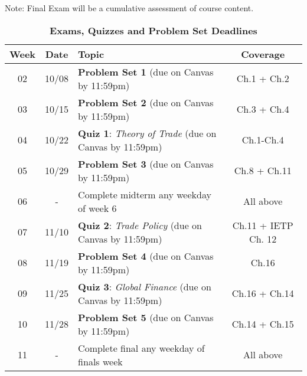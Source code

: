 \documentclass[10pt]{article}
\newcommand{\ra}[1]{\renewcommand{\arraystretch}{#1}}
\begin{document}
Note: Final Exam will be a cumulative assessment of course content. 

\newpage

\begin{table}[h!]
	\caption*{\large\textbf{Exams, Quizzes and Problem Set Deadlines}}
	\centering
	\ra{1.5}
	\begin{tabular}{@{\extracolsep{0.5cm}} c c l c @{}}
		\toprule
		\textbf{Week} & \textbf{Date} & \textbf{Topic} & \textbf{Coverage}  \\ \toprule 
		02 & 10/08 & \textbf{Problem Set 1} (due on Canvas by 11:59pm) & Ch.1 + Ch.2  \\
		03 & 10/15 & \textbf{Problem Set 2} (due on Canvas by 11:59pm) & Ch.3 + Ch.4  \\ 
		04 & 10/22 & \textbf{Quiz 1}: \textit{Theory of Trade} (due on Canvas by 11:59pm) & Ch.1-Ch.4 \\
		05 & 10/29 & \textbf{Problem Set 3} (due on Canvas by 11:59pm) & Ch.8 + Ch.11 \\ 
		06 & - & Complete midterm any weekday of week 6 & All above\\
		07 & 11/10 & \textbf{Quiz 2}: \textit{Trade Policy} (due on Canvas by 11:59pm) & Ch.11 + IETP Ch. 12 \\ 
		08 & 11/19 & \textbf{Problem Set 4} (due on Canvas by 11:59pm) &  Ch.16 \\
		09 & 11/25 & \textbf{Quiz 3}: \textit{Global Finance} (due on Canvas by 11:59pm)&  Ch.16 + Ch.14 \\ 
		10 & 11/28 & \textbf{Problem Set 5} (due on Canvas by 11:59pm)& Ch.14 + Ch.15 \\
		11 & - & Complete final any weekday of finals week & All above \\  \bottomrule
	\end{tabular}
\end{table}
\end{document}
